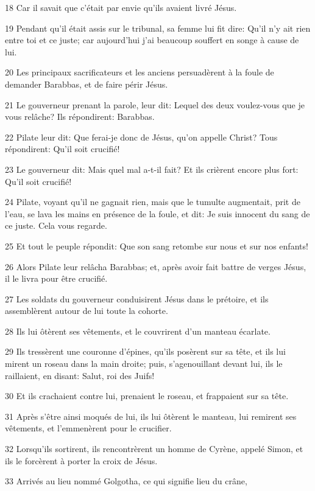\par 18 Car il savait que c'était par envie qu'ils avaient livré Jésus.
\par 19 Pendant qu'il était assis sur le tribunal, sa femme lui fit dire: Qu'il n'y ait rien entre toi et ce juste; car aujourd'hui j'ai beaucoup souffert en songe à cause de lui.
\par 20 Les principaux sacrificateurs et les anciens persuadèrent à la foule de demander Barabbas, et de faire périr Jésus.
\par 21 Le gouverneur prenant la parole, leur dit: Lequel des deux voulez-vous que je vous relâche? Ils répondirent: Barabbas.
\par 22 Pilate leur dit: Que ferai-je donc de Jésus, qu'on appelle Christ? Tous répondirent: Qu'il soit crucifié!
\par 23 Le gouverneur dit: Mais quel mal a-t-il fait? Et ils crièrent encore plus fort: Qu'il soit crucifié!
\par 24 Pilate, voyant qu'il ne gagnait rien, mais que le tumulte augmentait, prit de l'eau, se lava les mains en présence de la foule, et dit: Je suis innocent du sang de ce juste. Cela vous regarde.
\par 25 Et tout le peuple répondit: Que son sang retombe sur nous et sur nos enfants!
\par 26 Alors Pilate leur relâcha Barabbas; et, après avoir fait battre de verges Jésus, il le livra pour être crucifié.
\par 27 Les soldats du gouverneur conduisirent Jésus dans le prétoire, et ils assemblèrent autour de lui toute la cohorte.
\par 28 Ils lui ôtèrent ses vêtements, et le couvrirent d'un manteau écarlate.
\par 29 Ils tressèrent une couronne d'épines, qu'ils posèrent sur sa tête, et ils lui mirent un roseau dans la main droite; puis, s'agenouillant devant lui, ils le raillaient, en disant: Salut, roi des Juifs!
\par 30 Et ils crachaient contre lui, prenaient le roseau, et frappaient sur sa tête.
\par 31 Après s'être ainsi moqués de lui, ils lui ôtèrent le manteau, lui remirent ses vêtements, et l'emmenèrent pour le crucifier.
\par 32 Lorsqu'ils sortirent, ils rencontrèrent un homme de Cyrène, appelé Simon, et ils le forcèrent à porter la croix de Jésus.
\par 33 Arrivés au lieu nommé Golgotha, ce qui signifie lieu du crâne,
